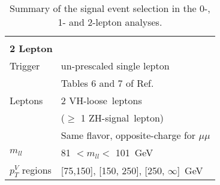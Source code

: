 \begin{table}[h]
\begin{center}
\begin{tabular}{l l}
  &\\
\multicolumn{2}{l}{\textbf{2 Lepton}}\\
Trigger &  un-prescaled single lepton\\
        & Tables 6 and 7 of Ref.~\cite{VHobjectsupportnote}\\
Leptons & 2 VH-loose\ leptons \\
        & ($\ge$ 1 ZH-signal\ lepton) \\
        &  Same flavor, opposite-charge for $\mu\mu$ \\
$m_{ll}$   & 81 $< m_{ll} <$ 101~GeV \\
$p_T^{V}$ regions & [75,150], [150, 250], [250, $\infty$]~GeV  \\
\bottomrule

\end{tabular}
\caption{Summary of the signal event selection in the 0-, 1- and 2-lepton analyses.}
\label{tab:event-selection}
\end{center}
\end{table}